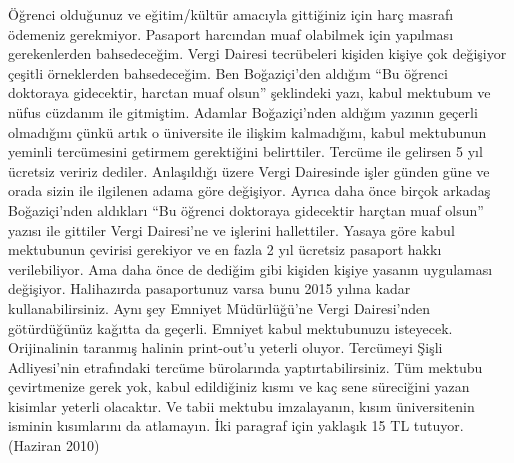 \documentclass[12pt]{article}
\begin{document}
Öğrenci olduğunuz ve eğitim/kültür amacıyla gittiğiniz için harç masrafı ödemeniz gerekmiyor. Pasaport harcından muaf olabilmek için yapılması gerekenlerden bahsedeceğim. Vergi Dairesi tecrübeleri kişiden kişiye çok değişiyor çeşitli örneklerden bahsedeceğim. Ben Boğaziçi'den aldığım ``Bu öğrenci doktoraya gidecektir, harctan muaf olsun'' şeklindeki yazı, kabul mektubum ve nüfus cüzdanım ile gitmiştim. Adamlar Boğaziçi'nden aldığım yazının geçerli olmadığını çünkü artık o üniversite ile ilişkim kalmadığını, kabul mektubunun yeminli tercümesini getirmem gerektiğini belirttiler. Tercüme ile gelirsen 5 yıl ücretsiz veririz dediler. Anlaşıldığı üzere Vergi Dairesi\-nde işler günden güne ve orada sizin ile ilgilenen adama göre değişiyor. Ayrıca daha önce birçok arkadaş Boğaziçi'nden aldıkları ``Bu öğrenci doktoraya gidecektir harçtan muaf olsun'' yazısı ile gittiler Vergi Dairesi'ne ve işlerini hallettiler. Yasaya göre kabul mektubunun çevirisi gerekiyor ve en fazla 2 yıl ücretsiz pasaport hakkı verilebiliyor. Ama daha önce de dediğim gibi kişiden kişiye yasanın uygulaması değişiyor.  Halihazırda pasaportunuz varsa bunu 2015 yılına kadar kullanabilirsiniz. Aynı şey Emniyet Müdürlüğü'ne Vergi Dairesi'nden götürdüğünüz kağıtta da geçerli. Emniyet kabul mektubunuzu isteyecek. Orijinalinin taranmış halinin print-out'u yeterli oluyor. Tercümeyi Şişli Adliyesi'nin etrafındaki tercüme bürolarında yaptırtabilirsiniz. Tüm mektubu çevirtmenize gerek yok, kabul edildiğiniz kısmı ve kaç sene süreciğini yazan kisimlar yeterli olacaktır. Ve tabii mektubu imzalayanın, kısım üniversitenin isminin kısımlarını da atlamayın. İki paragraf için yaklaşık 15 TL tutuyor. (Haziran 2010) 
\end{document}
